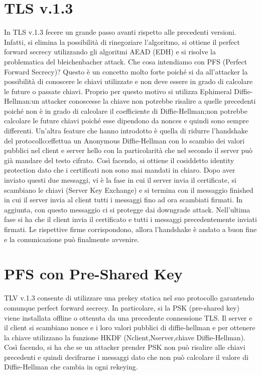 \documentclass{article}
\begin{document}
\section{TLS v.1.3}
In TLS v.1.3 fecere un grande passo avanti rispetto alle precedenti versioni\@. Infatti, si elimina la possibilità di rinegoziare l'algoritmo, si ottiene il perfect forward secrecy utilizzando gli algoritmi AEAD (EDH) e si risolve la problematica del bleichenbacher attack\@.\newline
Che cosa intendiamo con PFS (Perfect Forward Secrecy)? Questo è un concetto molto forte poiché si da all'attacker la possibilità di conoscere le chiavi utilizzate e non deve essere in grado di calcolare le future o passate chiavi\@.
Proprio per questo motivo si utilizza Ephimeral Diffie-Hellman:\@se un attacker conoscesse la chiave non potrebbe risalire a quelle precedenti poiché non è in grado di calcolare il coefficiente di Diffie-Hellman;\@similmente non potrebbe calcolare le future chiavi poiché esse dipendono da nonces e quindi sono sempre differenti\@.\newline
Un'altra feature che hanno introdotto è quella di ridurre l'handshake del protocollo:\@si effettua un Anonymous Diffie-Hellman con lo scambio dei valori pubblici nel client e server hello con la particolarità che nel secondo il server può già mandare del testo cifrato\@. Così facendo, si ottiene il cosiddetto identity protection dato che i certificati non sono mai mandati in chiaro\@.\newline
Dopo aver inviato questi due messaggi, vi è la fase in cui il server invia il certificate, si scambiano le chiavi (Server Key Exchange) e si termina con il messaggio finished in cui il server invia al client tutti i messaggi fino ad ora scambiati firmati\@. In aggiunta, con questo messaggio ci si protegge dai downgrade attack\@.
Nell'ultima fase si ha che il client invia il certificato e tutti i messaggi precedentemente inviati firmati\@. Le rispettive firme corrispondono, allora l'handshake è andato a buon fine e la comunicazione può finalmente avvenire\@.
\section{PFS con Pre-Shared Key}
TLV v.1.3 consente di utilizzare una prekey statica nel suo protocollo garantendo comunque perfect forward secrecy\@. In particolare, si la PSK (pre-shared key) viene installata offline o ottenuta da una precedente connessione TLS\@.
Il server e il client si scambiano nonce e i loro valori pubblici di diffie-hellman e per ottenere la chiave utilizzano la funzione HKDF (Nclient,Nserver,chiave Diffie-Hellman)\@.\newline
Così facendo, si ha che se un attacker prender PSK non può risalire alle chiavi precedenti e quindi decifrarne i messaggi dato che non può calcolare il valore di Diffie-Hellman che cambia in ogni rekeying\@.
\end{document}
